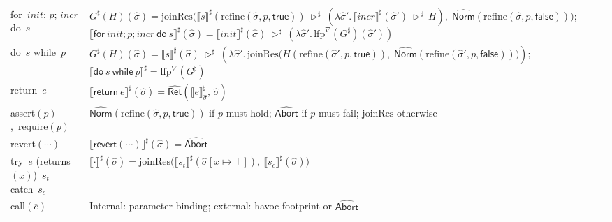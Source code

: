 \documentclass[pdflatex,sn-basic]{sn-jnl}%
\theoremstyle{thmstyleone}%
\theoremstyle{thmstyletwo}%
\theoremstyle{thmstylethree}%
\newcommand{\Abort}{\mathsf{Abort}}
\newcommand{\Norm}{\mathsf{Norm}}
\newcommand{\Ret}{\mathsf{Ret}}
\begin{document}
\begin{table}[h]
\begin{tabularx}{\columnwidth}{@{}l X@{}}
    \textsf{for}\ $init$; $p$; $incr$ \textsf{do}\ $s$ &
    $G^\sharp(H)(\hat{\sigma})=\mathrm{joinRes}\big(
      \llbracket s\rrbracket^\sharp(\mathrm{refine}(\hat{\sigma},p,\mathsf{true}))\ \triangleright^\sharp\ (\lambda \hat{\sigma}'.\,\llbracket incr\rrbracket^\sharp(\hat{\sigma}')\ \triangleright^\sharp\ H),\;
      \widehat{\Norm}(\mathrm{refine}(\hat{\sigma},p,\mathsf{false}))
    \big)$;
    $\llbracket \textsf{for}\ init; p; incr\ \textsf{do}\ s\rrbracket^\sharp(\hat{\sigma})=
      \llbracket init\rrbracket^\sharp(\hat{\sigma})\ \triangleright^\sharp\ (\lambda \hat{\sigma}'.\,\mathrm{lfp}^{\nabla}(G^\sharp)(\hat{\sigma}'))$\\

    \textsf{do}\ $s$ \textsf{while}\ $p$ &
    $G^\sharp(H)(\hat{\sigma})=\llbracket s\rrbracket^\sharp(\hat{\sigma})\ \triangleright^\sharp\ (\lambda \hat{\sigma}'.\,\mathrm{joinRes}\big(
      H(\mathrm{refine}(\hat{\sigma}',p,\mathsf{true})),\;
      \widehat{\Norm}(\mathrm{refine}(\hat{\sigma}',p,\mathsf{false}))
    \big))$;
    $\llbracket \textsf{do}\ s\ \textsf{while}\ p\rrbracket^\sharp = \mathrm{lfp}^{\nabla}(G^\sharp)$\\

    \textsf{return}\ $e$ &
    $\llbracket \textsf{return}\ e\rrbracket^\sharp(\hat{\sigma})=\widehat{\Ret}(\llbracket e\rrbracket^\sharp_{\hat{\sigma}},\,\hat{\sigma})$\\

    \textsf{assert}$(p)$,\ \textsf{require}$(p)$ &
    $\widehat{\Norm}(\mathrm{refine}(\hat{\sigma},p,\mathsf{true}))$ if $p$ must-hold; $\widehat{\Abort}$ if $p$ must-fail; $\mathrm{joinRes}$ otherwise\\

    \textsf{revert}$(\cdots)$ &
    $\llbracket \textsf{revert}(\cdots)\rrbracket^\sharp(\hat{\sigma})=\widehat{\Abort}$\\

    \textsf{try}\ $e$ (\textsf{returns}\ $(x)$)\ $s_t$ \textsf{catch}\ $s_c$ &
    $\llbracket \cdot\rrbracket^\sharp(\hat{\sigma})=\mathrm{joinRes}\!\big(
      \llbracket s_t\rrbracket^\sharp(\hat{\sigma}[x\mapsto \top]),\
      \llbracket s_c\rrbracket^\sharp(\hat{\sigma})
    \big)$\\

    \textsf{call}$(\overline{e})$ &
    Internal: parameter binding; external: havoc footprint or $\widehat{\Abort}$\\
    \bottomrule
  \end{tabularx}
\end{table}
\end{document}
